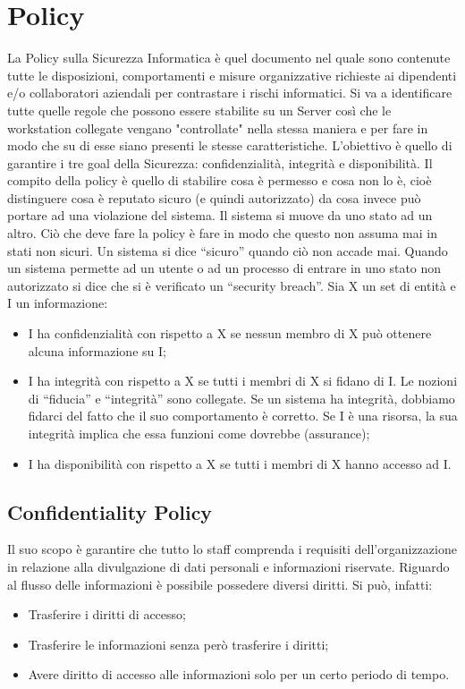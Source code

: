 
\chapter {Policy}

La Policy sulla Sicurezza Informatica è quel documento nel quale sono
contenute tutte le
disposizioni, comportamenti e misure organizzative richieste ai dipendenti
e/o collaboratori
aziendali per contrastare i rischi informatici. Si va a identificare tutte
quelle regole che possono
essere stabilite su un Server così che le workstation collegate vengano
"controllate" nella stessa
maniera e per fare in modo che su di esse siano presenti le stesse
caratteristiche.
L’obiettivo è quello di garantire i tre goal della Sicurezza:
confidenzialità, integrità e disponibilità.
Il compito della policy è quello di stabilire cosa è permesso e cosa non
lo è, cioè distinguere cosa è
reputato sicuro (e quindi autorizzato) da cosa invece può portare ad una
violazione del sistema. Il
sistema si muove da uno stato ad un altro. Ciò che deve fare la policy è
fare in modo che questo
non assuma mai in stati non sicuri. Un sistema si dice “sicuro” quando ciò
non accade mai.
Quando un sistema permette ad un utente o ad un processo di entrare in uno
stato non autorizzato
si dice che si è verificato un “security breach”.
Sia X un set di entità e I un informazione:
\begin{itemize}
    \item I ha confidenzialità con rispetto a X se nessun membro di X può
          ottenere alcuna
          informazione su I;
    \item I ha integrità con rispetto a X se tutti i membri di X si fidano
          di I. Le nozioni di “fiducia” e
          “integrità” sono collegate. Se un sistema ha integrità, dobbiamo
          fidarci del fatto che il suo
          comportamento è corretto. Se I è una risorsa, la sua integrità implica
          che essa funzioni
          come dovrebbe (assurance);
    \item I ha disponibilità con rispetto a X se tutti i membri di X hanno
          accesso ad I.
\end{itemize}


\section{Confidentiality Policy}

Il suo scopo è garantire che tutto lo staff comprenda i requisiti
dell'organizzazione in relazione alla
divulgazione di dati personali e informazioni riservate.
Riguardo al flusso delle informazioni è possibile possedere diversi
diritti. Si può, infatti:
\begin{itemize}
    \item Trasferire i diritti di accesso;
    \item Trasferire le informazioni senza però trasferire i diritti;
    \item Avere diritto di accesso alle informazioni solo per un certo
          periodo di tempo.
\end{itemize}

